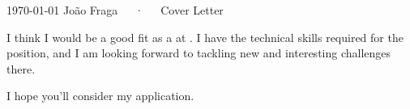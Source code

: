\documentclass[11pt, a4paper]{cv}
\begin{document}
\makecvheader[R]

\makecvfooter
  {\today}
  {João Fraga~~~·~~~Cover Letter}
  {}

\makelettertitle

\begin{cvletter}








I think I would be a good fit as a \makerole{} at \makecompany{}. I have the technical skills required for the position, and I am looking forward to tackling new and interesting challenges there.

I hope you'll consider my application.

\end{cvletter}

\makeletterclosing
\end{document}
